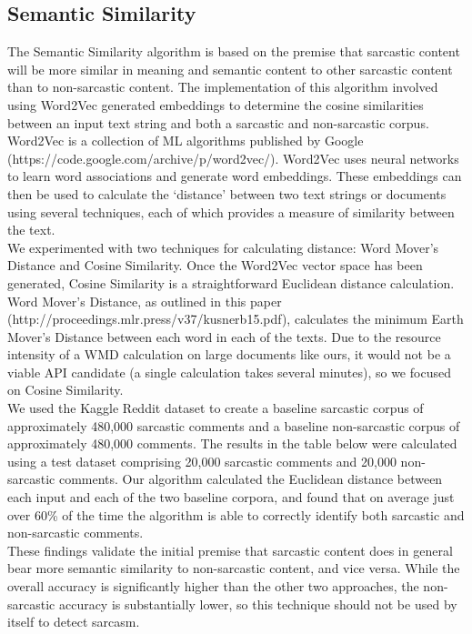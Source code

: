 \documentclass[conference]{IEEEtran}
\begin{document}
\subsection{Semantic Similarity}
The Semantic Similarity algorithm is based on the premise that sarcastic content will be more similar in meaning and semantic content to other sarcastic content than to non-sarcastic content.  The implementation of this algorithm involved using Word2Vec generated embeddings to determine the cosine similarities between an input text string and both a sarcastic and non-sarcastic corpus.  Word2Vec is a collection of ML algorithms published by Google (https://code.google.com/archive/p/word2vec/). Word2Vec uses neural networks to learn word associations and generate word embeddings.  These embeddings can then be used to calculate the ‘distance’ between two text strings or documents using several techniques, each of which provides a measure of similarity between the text.  \\
We experimented with two techniques for calculating distance: Word Mover’s Distance and Cosine Similarity.  Once the Word2Vec vector space has been generated, Cosine Similarity is a straightforward Euclidean distance calculation.  Word Mover’s Distance, as outlined in this paper (http://proceedings.mlr.press/v37/kusnerb15.pdf), calculates the minimum Earth Mover’s Distance between each word in each of the texts.  Due to the resource intensity of a WMD calculation on large documents like ours, it would not be a viable API candidate (a single calculation takes several minutes), so we focused on Cosine Similarity.  \\ 
We used the Kaggle Reddit dataset to create a baseline sarcastic corpus of approximately 480,000 sarcastic comments and a baseline non-sarcastic corpus of approximately 480,000 comments.  The results in the table below were calculated using a test dataset comprising 20,000 sarcastic comments and 20,000 non-sarcastic comments.  Our algorithm calculated the Euclidean distance between each input and each of the two baseline corpora, and found that on average just over 60\% of the time the algorithm is able to correctly identify both sarcastic and non-sarcastic comments.\\
These findings validate the initial premise that sarcastic content does in general bear more semantic similarity to non-sarcastic content, and vice versa.  While the overall accuracy is significantly higher than the other two approaches, the non-sarcastic accuracy is substantially lower, so this technique should not be used by itself to detect sarcasm. \\
\end{document}
